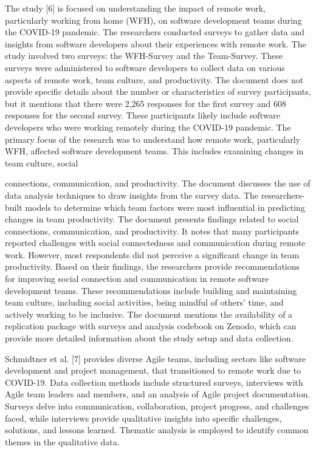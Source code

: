 \documentclass[conference]{IEEEtran}
\begin{document}
The study [6] is focused on understanding the impact of remote work, particularly working from home (WFH), on software development teams during the COVID-19 pandemic. The researchers conducted surveys to gather data and insights from software developers about their experiences with remote work. The study involved two surveys: the WFH-Survey and the Team-Survey. These surveys were administered to software developers to collect data on various aspects of remote work, team culture, and productivity. The document does not provide specific details about the number or characteristics of survey participants, but it mentions that there were 2,265 responses for the first survey and 608 responses for the second survey. These participants likely include software developers who were working remotely during the COVID-19 pandemic. The primary focus of the research was to understand how remote work, particularly WFH, affected software development teams. This includes examining changes in team culture, social

connections, communication, and productivity. The document discusses the use of data analysis techniques to draw insights from the survey data. The researchers-built models to determine which team factors were most influential in predicting changes in team productivity. The document presents findings related to social connections, communication, and productivity. It notes that many participants reported challenges with social connectedness and communication during remote work. However, most respondents did not perceive a significant change in team productivity. Based on their findings, the researchers provide recommendations for improving social connection and communication in remote software development teams. These recommendations include building and maintaining team culture, including social activities, being mindful of others' time, and actively working to be inclusive. The document mentions the availability of a replication package with surveys and analysis codebook on Zenodo, which can provide more detailed information about the study setup and data collection.

Schmidtner et al. [7] provides diverse Agile teams, including sectors like software development and project management, that transitioned to remote work due to COVID-19. Data collection methods include structured surveys, interviews with Agile team leaders and members, and an analysis of Agile project documentation. Surveys delve into communication, collaboration, project progress, and challenges faced, while interviews provide qualitative insights into specific challenges, solutions, and lessons learned. Thematic analysis is employed to identify common themes in the qualitative data.
\end{document}

